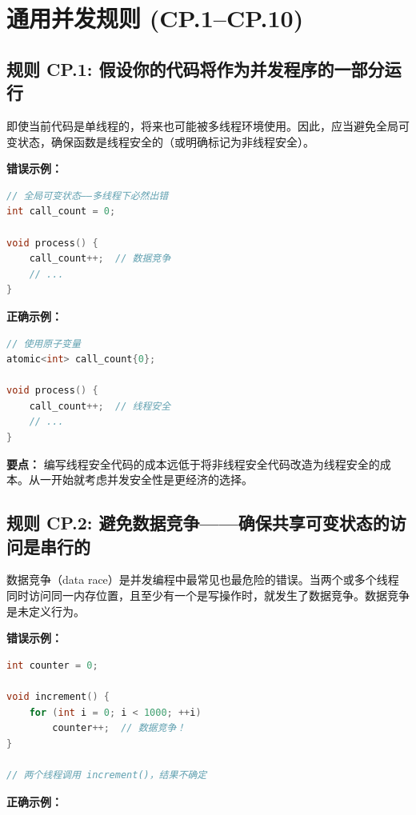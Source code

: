 \section{通用并发规则 (CP.1--CP.10)}

\subsection*{\textbf{规则 CP.1:} 假设你的代码将作为并发程序的一部分运行}

即使当前代码是单线程的，将来也可能被多线程环境使用。因此，应当避免全局可变状态，确保函数是线程安全的（或明确标记为非线程安全）。

\textbf{错误示例：}

\begin{lstlisting}[language=C++]
// 全局可变状态——多线程下必然出错
int call_count = 0;

void process() {
    call_count++;  // 数据竞争
    // ...
}
\end{lstlisting}

\textbf{正确示例：}

\begin{lstlisting}[language=C++]
// 使用原子变量
atomic<int> call_count{0};

void process() {
    call_count++;  // 线程安全
    // ...
}
\end{lstlisting}

\textbf{要点：} 编写线程安全代码的成本远低于将非线程安全代码改造为线程安全的成本。从一开始就考虑并发安全性是更经济的选择。

\subsection*{\textbf{规则 CP.2:} 避免数据竞争——确保共享可变状态的访问是串行的}

数据竞争（data race）是并发编程中最常见也最危险的错误。当两个或多个线程同时访问同一内存位置，且至少有一个是写操作时，就发生了数据竞争。数据竞争是未定义行为。

\textbf{错误示例：}

\begin{lstlisting}[language=C++]
int counter = 0;

void increment() {
    for (int i = 0; i < 1000; ++i)
        counter++;  // 数据竞争！
}

// 两个线程调用 increment()，结果不确定
\end{lstlisting}

\textbf{正确示例：}

